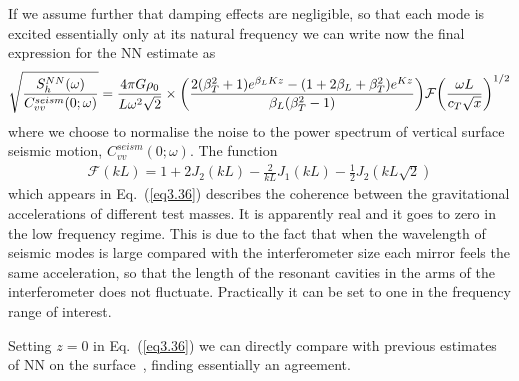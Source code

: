 If we assume further that damping effects are negligible, so that each mode is excited essentially only at its natural frequency we can write now the final expression for the NN estimate as
\begin{eqnarray}
	\sqrt{\frac{S^{NN}_{h}(\omega)}{C^{seism}_{vv}(0;\omega)}}= \frac{4\pi G\rho_{0}}{L\omega^{2}\sqrt{2}} \times\bigg{(}\frac{2(\beta^{2}_{T}+1)e^{\beta_{L}Kz}-(1+2\beta_{L}+\beta^{2}_{T}) e^{Kz}}{\beta_{L}(\beta^{2}_{T}-1)}\bigg{)}\mathcal{F}\bigg{(}\frac{\omega L}{c_{T}\sqrt{x}}\bigg{)}^{1/2}
	\label{eq3.36}
\end{eqnarray}
where we choose to normalise the noise to the power spectrum of vertical surface seismic motion, $C^{seism}_{vv}(0;\omega)$. The function
\begin{eqnarray}
	\mathcal{F}(kL)=1+2J_{2}(kL)-\frac{2}{kL}J_{1}(kL)-\frac{1}{2}J_{2}(kL\sqrt{2})
	\label{eq3.33}
\end{eqnarray}
which appears in Eq.~(\ref{eq3.36}) describes the coherence between the gravitational accelerations of different test masses. It is apparently real and it goes to zero in the low frequency regime. This is due to the fact that when the wavelength of seismic modes is large compared with the interferometer size each mirror feels the same acceleration, so that the length of the resonant cavities in the arms of the interferometer does not fluctuate. Practically it can be set to one in the frequency range of interest.

Setting $z=0$ in Eq.~(\ref{eq3.36}) we can directly compare with previous estimates of NN on the surface~\cite{GGSaulson, GGCellaCuoco, GGThorne}, finding essentially an agreement.

